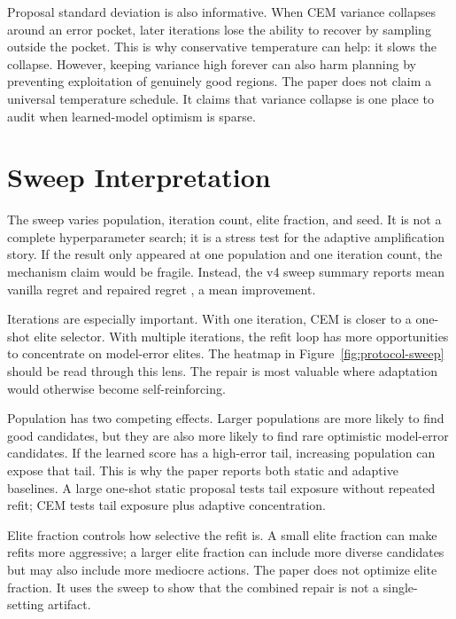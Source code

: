 Proposal standard deviation is also informative. When CEM variance collapses
around an error pocket, later iterations lose the ability to recover by
sampling outside the pocket. This is why conservative temperature can help:
it slows the collapse. However, keeping variance high forever can also harm
planning by preventing exploitation of genuinely good regions. The paper does
not claim a universal temperature schedule. It claims that variance collapse
is one place to audit when learned-model optimism is sparse.

\section{Sweep Interpretation}
\label{app:sweep-interpretation}

The sweep varies population, iteration count, elite fraction, and seed. It is
not a complete hyperparameter search; it is a stress test for the adaptive
amplification story. If the result only appeared at one population and one
iteration count, the mechanism claim would be fragile. Instead, the v4 sweep
summary reports mean vanilla regret \VFourSweepCEMRegret{} and repaired
regret \VFourSweepRepairedRegret{}, a \VFourSweepGain{} mean improvement.

Iterations are especially important. With one iteration, CEM is closer to a
one-shot elite selector. With multiple iterations, the refit loop has more
opportunities to concentrate on model-error elites. The heatmap in
Figure~\ref{fig:protocol-sweep} should be read through this lens. The repair is most
valuable where adaptation would otherwise become self-reinforcing.

Population has two competing effects. Larger populations are more likely to
find good candidates, but they are also more likely to find rare optimistic
model-error candidates. If the learned score has a high-error tail, increasing
population can expose that tail. This is why the paper reports both static and
adaptive baselines. A large one-shot static proposal tests tail exposure
without repeated refit; CEM tests tail exposure plus adaptive concentration.

Elite fraction controls how selective the refit is. A small elite fraction can
make refits more aggressive; a larger elite fraction can include more diverse
candidates but may also include more mediocre actions. The paper does not
optimize elite fraction. It uses the sweep to show that the combined repair is
not a single-setting artifact.

